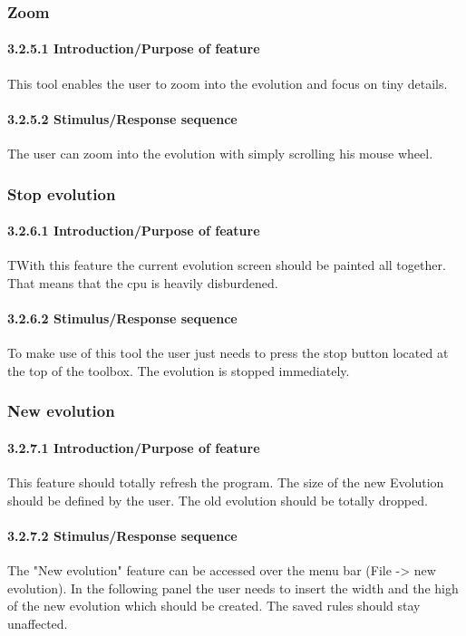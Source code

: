 \documentclass[titlepage,12pt]{scrartcl}
\begin{document}
\subsubsection{Zoom}
\paragraph{3.2.5.1	Introduction/Purpose of feature}
This tool enables the user to zoom into the evolution and focus on tiny details. 
\paragraph{3.2.5.2	Stimulus/Response sequence}
The user can zoom into the evolution with simply scrolling his mouse wheel.

\subsubsection{Stop evolution}
\paragraph{3.2.6.1	Introduction/Purpose of feature}
TWith this feature the current evolution screen should be painted all together. That means that the cpu is heavily disburdened. 
\paragraph{3.2.6.2	Stimulus/Response sequence}
To make use of this tool the user just needs to press the stop button located at the top of the toolbox. The evolution is stopped immediately.

\subsubsection{New evolution}
\paragraph{3.2.7.1	Introduction/Purpose of feature}
This feature should totally refresh the program. The size of the new Evolution should be defined by the user. The old evolution should be totally dropped.
\paragraph{3.2.7.2	Stimulus/Response sequence}
The "New evolution" feature can be accessed over the menu bar (File -> new evolution). In the following panel the user needs to insert the width and the high of the new evolution which should be created. The saved rules should stay unaffected.
\end{document}
